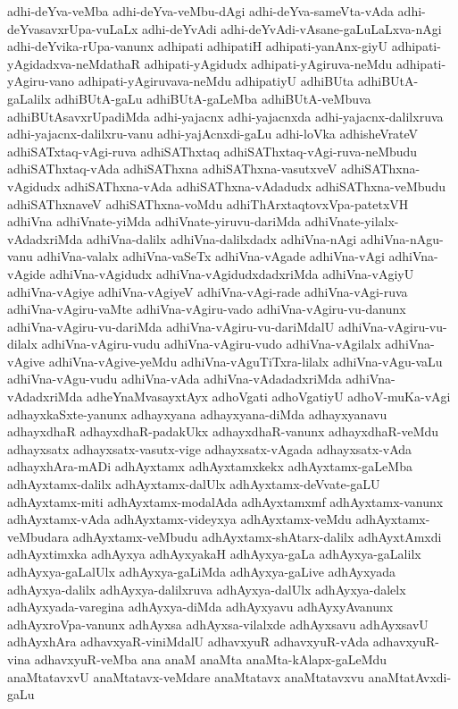 {adhi-deYva-veMba
adhi-deYva-veMbu-dAgi
adhi-deYva-sameVta-vAda
adhi-deYvasavxrUpa-vuLaLx
adhi-deYvAdi
adhi-deYvAdi-vAsane-gaLuLaLxva-nAgi
adhi-deYvika-rUpa-vanunx
adhipati
adhipatiH
adhipati-yanAnx-giyU
adhipati-yAgidadxva-neMdathaR
adhipati-yAgidudx
adhipati-yAgiruva-neMdu
adhipati-yAgiru-vano
adhipati-yAgiruvava-neMdu
adhipatiyU
adhiBUta
adhiBUtA-gaLalilx
adhiBUtA-gaLu
adhiBUtA-gaLeMba
adhiBUtA-veMbuva
adhiBUtAsavxrUpadiMda
adhi-yajacnx
adhi-yajacnxda
adhi-yajacnx-dalilxruva
adhi-yajacnx-dalilxru-vanu
adhi-yajAcnxdi-gaLu
adhi-loVka
adhisheVrateV
adhiSATxtaq-vAgi-ruva
adhiSAThxtaq
adhiSAThxtaq-vAgi-ruva-neMbudu
adhiSAThxtaq-vAda
adhiSAThxna
adhiSAThxna-vasutxveV
adhiSAThxna-vAgidudx
adhiSAThxna-vAda
adhiSAThxna-vAdadudx
adhiSAThxna-veMbudu
adhiSAThxnaveV
adhiSAThxna-voMdu
adhiThArxtaqtovxVpa-patetxVH
adhiVna
adhiVnate-yiMda
adhiVnate-yiruvu-dariMda
adhiVnate-yilalx-vAdadxriMda
adhiVna-dalilx
adhiVna-dalilxdadx
adhiVna-nAgi
adhiVna-nAgu-vanu
adhiVna-valalx
adhiVna-vaSeTx
adhiVna-vAgade
adhiVna-vAgi
adhiVna-vAgide
adhiVna-vAgidudx
adhiVna-vAgidudxdadxriMda
adhiVna-vAgiyU
adhiVna-vAgiye
adhiVna-vAgiyeV
adhiVna-vAgi-rade
adhiVna-vAgi-ruva
adhiVna-vAgiru-vaMte
adhiVna-vAgiru-vado
adhiVna-vAgiru-vu-danunx
adhiVna-vAgiru-vu-dariMda
adhiVna-vAgiru-vu-dariMdalU
adhiVna-vAgiru-vu-dilalx
adhiVna-vAgiru-vudu
adhiVna-vAgiru-vudo
adhiVna-vAgilalx
adhiVna-vAgive
adhiVna-vAgive-yeMdu
adhiVna-vAguTiTxra-lilalx
adhiVna-vAgu-vaLu
adhiVna-vAgu-vudu
adhiVna-vAda
adhiVna-vAdadadxriMda
adhiVna-vAdadxriMda
adheYnaMvasayxtAyx
adhoVgati
adhoVgatiyU
adhoV-muKa-vAgi
adhayxkaSxte-yanunx
adhayxyana
adhayxyana-diMda
adhayxyanavu
adhayxdhaR
adhayxdhaR-padakUkx
adhayxdhaR-vanunx
adhayxdhaR-veMdu
adhayxsatx
adhayxsatx-vasutx-vige
adhayxsatx-vAgada
adhayxsatx-vAda
adhayxhAra-mADi
adhAyxtamx
adhAyxtamxkekx
adhAyxtamx-gaLeMba
adhAyxtamx-dalilx
adhAyxtamx-dalUlx
adhAyxtamx-deVvate-gaLU
adhAyxtamx-miti
adhAyxtamx-modalAda
adhAyxtamxmf
adhAyxtamx-vanunx
adhAyxtamx-vAda
adhAyxtamx-videyxya
adhAyxtamx-veMdu
adhAyxtamx-veMbudara
adhAyxtamx-veMbudu
adhAyxtamx-shAtarx-dalilx
adhAyxtAmxdi
adhAyxtimxka
adhAyxya
adhAyxyakaH
adhAyxya-gaLa
adhAyxya-gaLalilx
adhAyxya-gaLalUlx
adhAyxya-gaLiMda
adhAyxya-gaLive
adhAyxyada
adhAyxya-dalilx
adhAyxya-dalilxruva
adhAyxya-dalUlx
adhAyxya-dalelx
adhAyxyada-varegina
adhAyxya-diMda
adhAyxyavu
adhAyxyAvanunx
adhAyxroVpa-vanunx
adhAyxsa
adhAyxsa-vilalxde
adhAyxsavu
adhAyxsavU
adhAyxhAra
adhavxyaR-viniMdalU
adhavxyuR
adhavxyuR-vAda
adhavxyuR-vina
adhavxyuR-veMba
ana
anaM
anaMta
anaMta-kAlapx-gaLeMdu
anaMtatavxvU
anaMtatavx-veMdare
anaMtatavx
anaMtatavxvu
anaMtatAvxdi-gaLu
}

